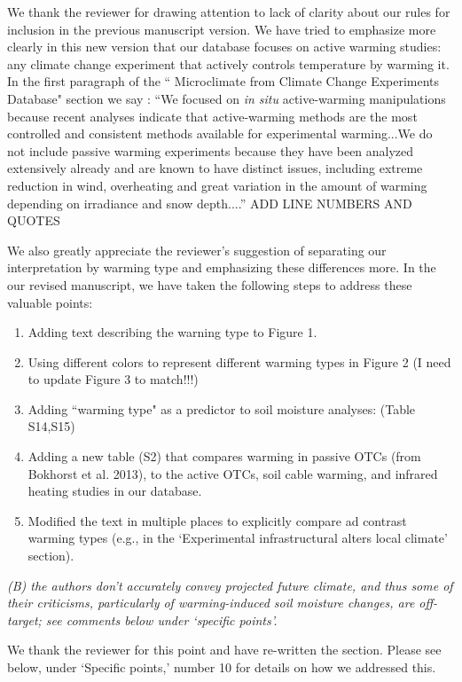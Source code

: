 \documentclass[11pt,a4paper]{letter}
\begin{document}
\begin{letter}{}
\par We thank the reviewer for drawing attention to lack of clarity about our rules for inclusion in the previous manuscript version. We have tried to emphasize more clearly in this new version that our database focuses on active warming studies: any climate change experiment that actively controls temperature by warming it. In the first paragraph of the `` Microclimate from Climate Change Experiments Database" section we say : ``We focused on \textit{in situ} active-warming manipulations because recent analyses indicate that active-warming methods are the most controlled and consistent methods available for experimental warming...We do not include passive warming experiments because they have been analyzed extensively already and are known to have distinct issues, including extreme reduction in wind, overheating and great variation in the amount of warming depending on irradiance and snow depth....''  ADD LINE NUMBERS AND QUOTES
\par We also greatly appreciate the reviewer's suggestion of separating our interpretation by warming type and emphasizing these differences more. In the our revised manuscript, we have taken the following steps to address these valuable points:
\begin{enumerate}
\item Adding text describing the warning type to Figure 1.
\item Using different colors  to represent different warming types in Figure 2 (I need to update Figure 3 to match!!!)
\item Adding ``warming type" as a predictor to soil moisture analyses: (Table S14,S15)
\item Adding a new table (S2) that compares warming in passive OTCs (from Bokhorst et al. 2013), to the active OTCs, soil cable warming, and infrared heating studies in our database.
\item Modified the text in multiple places to explicitly compare ad contrast warming types (e.g., in the `Experimental infrastructural alters local climate' section). 
\end{enumerate}


\par \emph{(B) the authors don't accurately convey projected future climate, and thus some of their criticisms, particularly of warming-induced soil moisture changes, are off-target; see comments below under `specific points'.}

\par We thank the reviewer for this point and have re-written the section. Please see below, under `Specific points,' number 10 for details on how we addressed this. 


\end{letter}
\end{document}

